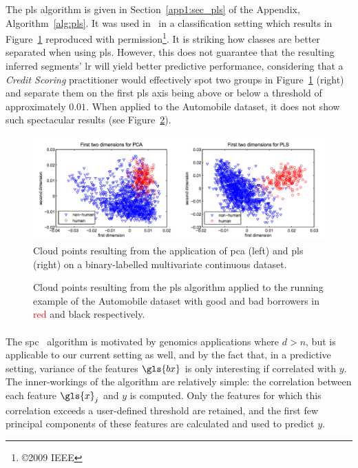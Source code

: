 The \gls{pls} algorithm is given in Section~\ref{app1:sec_pls} of the Appendix, Algorithm~\ref{alg:pls}. It was used in~\cite{schwartz2009human} in a classification setting which results in Figure~\ref{fig:pca_vs_pls} reproduced with permission\footnote{\copyright 2009 IEEE}. It is striking how classes are better separated when using \gls{pls}. However, this does not guarantee that the resulting inferred segments' \gls{lr} will yield better predictive performance, considering that a \textit{Credit Scoring} practitioner would effectively spot two groups in Figure~\ref{fig:pca_vs_pls} (right) and separate them on the first \gls{pls} axis being above or below a threshold of approximately $0.01$. When applied to the Automobile dataset, it does not show such spectacular results (see Figure~\ref{fig:simu_pls}).

\begin{figure}
\includegraphics[width = \textwidth]{figures/chapitre6/pca_vs_pls.png}
\caption{Cloud points resulting from the application of \gls{pca} (left) and \gls{pls} (right) on a binary-labelled multivariate continuous dataset.}
\label{fig:pca_vs_pls}
\end{figure}

\begin{figure}
\centering \resizebox{.8\textwidth}{!}{}
\caption{Cloud points resulting from the \gls{pls} algorithm applied to the running example of the Automobile dataset with good and bad borrowers in \textcolor{red}{red} and black respectively.}
\label{fig:simu_pls}
\end{figure}


\paragraph{}

The \gls{spc}~\cite{bair2006prediction} algorithm is motivated by genomics applications where $d > n$, but is applicable to our current setting as well, and by the fact that, in a predictive setting, variance of the features $\gls{bx}$ is only interesting if correlated with $y$. The inner-workings of the algorithm are relatively simple: the correlation between each feature $\gls{x}_j$ and $y$ is computed. Only the features for which this correlation exceeds a user-defined threshold are retained, and the first few principal components of these features are calculated and used to predict $y$.

